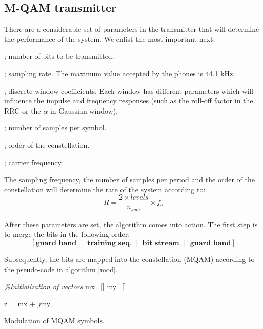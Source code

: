\documentclass[12pt,a4paper,openright]{report}
\begin{document}
\subsection{M-QAM transmitter}
	There are a considerable set of parameters in the transmitter that will determine the performance of the system. We enlist the most important next:



\begin{description}{\bfseries}
  \item[\bf{$N_b$}]; number of bits to be transmitted.
  \item[\bf{$f_s$}];  sampling rate. The maximum value accepted by the phones is 44.1 kHz.
  \item[\bf{Window}]; discrete window coefficients. Each window has different parameters which will influence the impulse and frequency responses (such as the roll-off factor in the RRC or the $\alpha$ in Gaussian window).
\item[\bf{$n_{sym}$}]; number of samples per symbol. 
  \item[\bf{$levels$}]; order of the constellation. 
\item[\bf{$f_c$}]; carrier frequency. 
\end{description}


The sampling frequency, the number of samples per period and the order of the constellation will determine the rate of the system according to:
\begin{equation}
R = \frac{{2 \times levels}}{{n_{sym}}} \times f_s
\end{equation}


After these parameters are set, the algorithm comes into action. The first step is to merge the bits in the following order:
\[
[\textbf{guard\_band   $\mid$  training seq.  $\mid$   bit\_stream  $\mid$   guard\_band}]
\]

Subsequently, the bits are mapped into the constellation (MQAM) according to the pseudo-code in algorithm \ref{mod}. 


\begin{algorithm}[H]
\BlankLine
\emph{\%Initialization of vectors}\;
mx=[]\;
my=[]\;

z = mx + $j$my
\caption{Modulation of MQAM symbols.}
\label{mod}
\end{algorithm}
\end{document}
